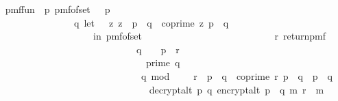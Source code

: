 \begin{isabellebody}
\isanewline
\ \ \isamarkupfalse%
\ {\isacharquery}{\kern0pt}pmf{\isacharunderscore}{\kern0pt}fun{\isacharprime}{\kern0pt}\ {\isacharequal}{\kern0pt}\ {\isachardoublequoteopen}{\isacharparenleft}{\kern0pt}{\isasymlambda}p{\isachardot}{\kern0pt}\ pmf{\isacharunderscore}{\kern0pt}of{\isacharunderscore}{\kern0pt}set\ {\isacharparenleft}{\kern0pt}{\isacharquery}{\kern0pt}{\isasymK}\ {\isacharminus}{\kern0pt}\ {\isacharbraceleft}{\kern0pt}p{\isacharbraceright}{\kern0pt}{\isacharparenright}{\kern0pt}\ {\isasymbind}\isanewline
\ \ \ \ \ \ \ \ \ \ \ \ \ \ \ \ \ \ {\isacharparenleft}{\kern0pt}{\isasymlambda}q{\isachardot}{\kern0pt}\ let\ {\isasymZ}\ {\isacharequal}{\kern0pt}\ {\isacharbraceleft}{\kern0pt}z{\isachardot}{\kern0pt}\ z\ {\isacharless}{\kern0pt}\ p\ {\isacharasterisk}{\kern0pt}\ q\ {\isasymand}\ coprime\ z\ {\isacharparenleft}{\kern0pt}p\ {\isacharasterisk}{\kern0pt}\ q{\isacharparenright}{\kern0pt}{\isacharbraceright}{\kern0pt}\isanewline
\ \ \ \ \ \ \ \ \ \ \ \ \ \ \ \ \ \ \ \ \ \ in\ pmf{\isacharunderscore}{\kern0pt}of{\isacharunderscore}{\kern0pt}set\ {\isasymZ}\ {\isasymbind}\isanewline
\ \ \ \ \ \ \ \ \ \ \ \ \ \ \ \ \ \ \ \ \ \ \ \ \ {\isacharparenleft}{\kern0pt}{\isasymlambda}r{\isachardot}{\kern0pt}\ return{\isacharunderscore}{\kern0pt}pmf\isanewline
\ \ \ \ \ \ \ \ \ \ \ \ \ \ \ \ \ \ \ \ \ \ \ \ \ \ \ \ \ \ \ {\isacharparenleft}{\kern0pt}{\isacharparenleft}{\kern0pt}q\ {\isasymin}\ {\isacharquery}{\kern0pt}{\isasymK}\ {\isacharminus}{\kern0pt}\ {\isacharbraceleft}{\kern0pt}p{\isacharbraceright}{\kern0pt}\ {\isasymand}\ r\ {\isasymin}\ {\isasymZ}\ {\isasymor}\isanewline
\ \ \ \ \ \ \ \ \ \ \ \ \ \ \ \ \ \ \ \ \ \ \ \ \ \ \ \ \ \ \ \ \ prime\ q\ {\isasymand}\isanewline
\ \ \ \ \ \ \ \ \ \ \ \ \ \ \ \ \ \ \ \ \ \ \ \ \ \ \ \ \ \ \ \ q\ mod\ {}\ {\isacharequal}{\kern0pt}\ {}\ {\isasymand}\ r\ {\isacharless}{\kern0pt}\ p\ {\isacharasterisk}{\kern0pt}\ q\ {\isasymand}\ coprime\ r\ {\isacharparenleft}{\kern0pt}p\ {\isacharasterisk}{\kern0pt}\ q{\isacharparenright}{\kern0pt}\ {\isasymand}\ p\ {\isasymnoteq}\ q{\isacharparenright}{\kern0pt}\ {\isasymor}\isanewline
\ \ \ \ \ \ \ \ \ \ \ \ \ \ \ \ \ \ \ \ \ \ \ \ \ \ \ \ \ \ \ \ decrypt{\isacharunderscore}{\kern0pt}alt\ p\ q\ {\isacharparenleft}{\kern0pt}encrypt{\isacharunderscore}{\kern0pt}alt\ {\isacharparenleft}{\kern0pt}p\ {\isacharasterisk}{\kern0pt}\ q{\isacharparenright}{\kern0pt}\ m\ r{\isacharparenright}{\kern0pt}\ {\isacharequal}{\kern0pt}\ m{\isacharparenright}{\kern0pt}{\isacharparenright}{\kern0pt}{\isacharparenright}{\kern0pt}{\isacharparenright}{\kern0pt}{\isachardoublequoteclose}\isanewline

\end{isabellebody}
